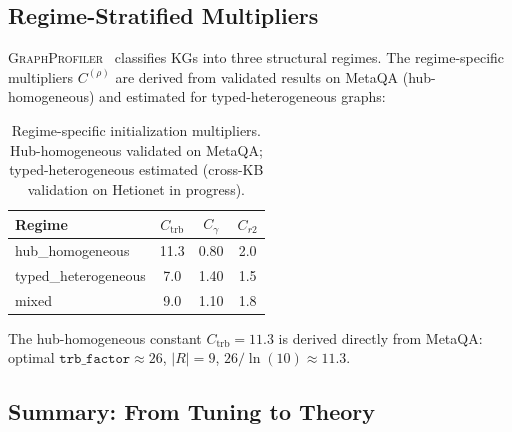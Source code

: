 \documentclass[10pt,twocolumn]{article}
\begin{document}
\subsection{Regime-Stratified Multipliers}
\label{sec:regime}

\textsc{GraphProfiler}~\cite{buchorn2026report} classifies KGs into three
structural regimes. The regime-specific multipliers $C^{(\rho)}$ are derived
from validated results on MetaQA (hub-homogeneous) and estimated for
typed-heterogeneous graphs:

\begin{table}[h]
\centering
\caption{Regime-specific initialization multipliers.
Hub-homogeneous validated on MetaQA; typed-heterogeneous estimated
(cross-KB validation on Hetionet in progress).}
\label{tab:regime}
\setlength{\tabcolsep}{5pt}
\begin{tabular}{lccc}
\toprule
\textbf{Regime} & $C_{\mathrm{trb}}$ & $C_\gamma$ & $C_{r2}$ \\
\midrule
hub\_homogeneous     & 11.3 & 0.80 & 2.0 \\
typed\_heterogeneous & 7.0  & 1.40 & 1.5 \\
mixed                & 9.0  & 1.10 & 1.8 \\
\bottomrule
\end{tabular}
\end{table}

The hub-homogeneous constant $C_{\mathrm{trb}} = 11.3$ is derived directly from
MetaQA: optimal $\texttt{trb\_factor} \approx 26$, $|R| = 9$,
$26 / \ln(10) \approx 11.3$.

\subsection{Summary: From Tuning to Theory}
\end{document}
